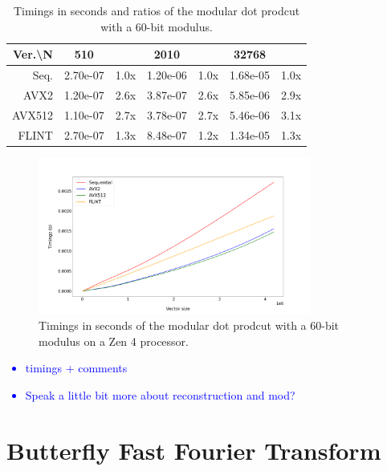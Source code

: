 \documentclass[a4paper]{article}
\begin{document}
\begin{table}[h!]
\begin{tabular}{|r|*{3}{c c|}}
        \hline
        \rowcolor{myGray}
        Ver.\textbackslash N & 510 & & 2010 & & 32768 & \\
        \hline
        \cellcolor{myGray} Seq. & 2.70e-07 & 1.0x & 1.20e-06 & 1.0x & 1.68e-05 & 1.0x \\
        \hline
        \cellcolor{myGray} AVX2 & 1.20e-07 & 2.6x & 3.87e-07 & 2.6x & 5.85e-06 & 2.9x \\
        \hline
        \cellcolor{myGray} AVX512 & 1.10e-07 & 2.7x & 3.78e-07 & 2.7x & 5.46e-06 & 3.1x \\
        \hline
        \cellcolor{myGray} FLINT & 2.70e-07 & 1.3x & 8.48e-07 & 1.2x & 1.34e-05 & 1.3x \\
        \hline
    \end{tabular}
    \caption{Timings in seconds and ratios of the modular dot prodcut with a 60-bit modulus.}
\end{table}

\begin{figure}[h!]
    \begin{center}
        \includegraphics[width=0.8\textwidth]{dot-prod-mod_argiope.png}
    \end{center}
    \caption{Timings in seconds of the modular dot prodcut with a 60-bit modulus on a Zen 4 processor.}
\end{figure}

\textcolor{blue}{
    \begin{itemize}
        \item timings + comments
        \item Speak a little bit more about reconstruction and mod?
    \end{itemize}
}

\section{Butterfly Fast Fourier Transform}
\end{document}
